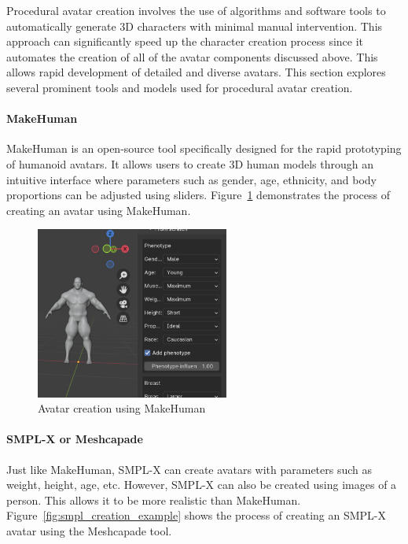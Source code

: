 \documentclass[../../main.tex]{subfiles}
\begin{document}
Procedural avatar creation involves the use of algorithms and software tools to automatically generate 3D characters with minimal manual intervention. This approach can significantly speed up the character creation process since it automates the creation of all of the avatar components discussed above. This allows rapid development of detailed and diverse avatars. This section explores several prominent tools and models used for procedural avatar creation.

\paragraph{MakeHuman}
\label{ch:background_work:sign_language_synthesis:3d_techniques:procedural_avatar_creation:makehuman}

MakeHuman is an open-source tool specifically designed for the rapid prototyping of humanoid avatars. It allows users to create 3D human models through an intuitive interface where parameters such as gender, age, ethnicity, and body proportions can be adjusted using sliders. Figure~\ref{fig:makehuman_example} demonstrates the process of creating an avatar using MakeHuman.

\begin{figure} 
  \centering \includegraphics[width = 2.5in]{chapters/background_work/images/makehuman_example.png} 
  \caption{Avatar creation using MakeHuman} 
  \label{fig:makehuman_example} 
\end{figure}

\paragraph{SMPL-X or Meshcapade}
\label{ch:background_work:sign_language_synthesis:3d_techniques:procedural_avatar_creation:smpl_x_meshcapade}

Just like MakeHuman, SMPL-X can create avatars with parameters such as weight, height, age, etc. However, SMPL-X can also be created using images of a person. This allows it to be more realistic than MakeHuman. Figure~\ref{fig:smpl_creation_example} shows the process of creating an SMPL-X avatar using the Meshcapade tool.
\end{document}
